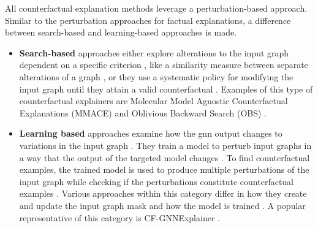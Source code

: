All counterfactual explanation methods leverage a perturbation-based approach. Similar to the perturbation approaches for factual explanations, a difference between search-based and learning-based approaches is made.


\begin{itemize}
    \item \textbf{Search-based} approaches either explore alterations to the input graph dependent on a specific criterion \cite{prado-romero_survey_2023}, like a similarity measure between separate alterations of a graph \cite{abrate_counterfactual_2021}, or they use a systematic policy for modifying the input graph until they attain a valid counterfactual \cite{prado-romero_survey_2023}. Examples of this type of counterfactual explainers are Molecular Model Agnostic Counterfactual Explanations (MMACE) \cite{wellawatte_model_2022} and Oblivious Backward Search (OBS) \cite{abrate_counterfactual_2021}.
    \item \textbf{Learning based} approaches examine how the \gls{gnn} output changes to variations in the input graph \cite{prado-romero_survey_2023}. They train a model to perturb input graphs in a way that the output of the targeted model changes \cite{lucic_cf-gnnexplainer_2022}. To find counterfactual examples, the trained model is used to produce multiple perturbations of the input graph while checking if the perturbations constitute counterfactual examples \cite{lucic_cf-gnnexplainer_2022}. Various approaches within this category differ in how they create and update the input graph mask and how the model is trained \cite{prado-romero_survey_2023}. A popular representative of this category is CF-GNNExplainer \cite{lucic_cf-gnnexplainer_2022}.
\end{itemize}

